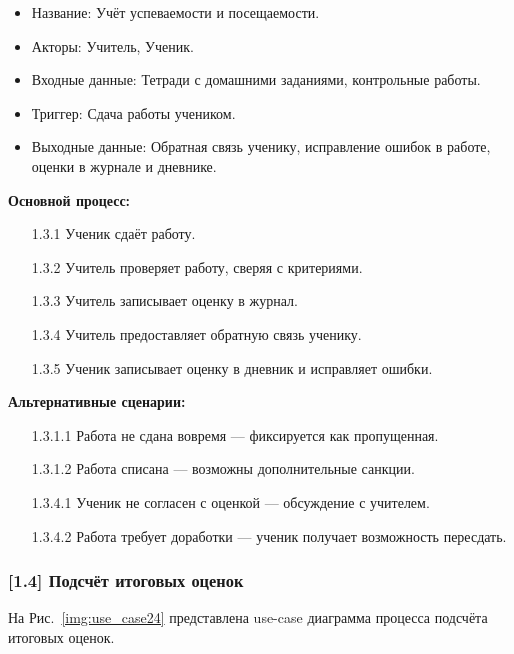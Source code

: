 \documentclass[a4paper, final]{article}
\begin{document}
\begin{itemize}
  \item Название: Учёт успеваемости и посещаемости.
  \item Акторы: Учитель, Ученик.
  \item Входные данные: Тетради с домашними заданиями, контрольные работы.
  \item Триггер: Сдача работы учеником.
  \item Выходные данные: Обратная связь ученику, исправление ошибок в работе, оценки в журнале и дневнике.
\end{itemize}

\textbf{Основной процесс:}
\begin{enumerate}
  \item[1.3.1] Ученик сдаёт работу.
  \item[1.3.2] Учитель проверяет работу, сверяя с критериями.
  \item[1.3.3] Учитель записывает оценку в журнал.
  \item[1.3.4] Учитель предоставляет обратную связь ученику.
  \item[1.3.5] Ученик записывает оценку в дневник и исправляет ошибки.
\end{enumerate}

\textbf{Альтернативные сценарии:}
\begin{itemize}
  \item[1.3.1.1] Работа не сдана вовремя --- фиксируется как пропущенная.
  \item[1.3.1.2] Работа списана --- возможны дополнительные санкции.
  \item[1.3.4.1] Ученик не согласен с оценкой --- обсуждение с учителем.
  \item[1.3.4.2] Работа требует доработки --- ученик получает возможность пересдать.
\end{itemize}

\subsubsection{[1.4] Подсчёт итоговых оценок}
На Рис.~\ref{img:use_case24} представлена use-case диаграмма процесса подсчёта итоговых оценок.
\end{document}
